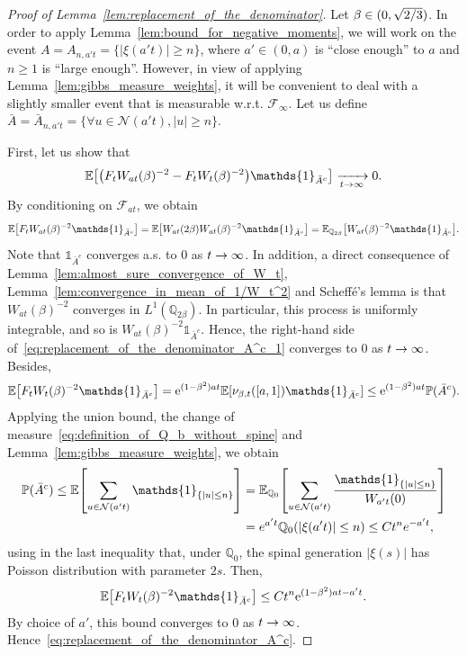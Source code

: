 \documentclass[AHL,Unicode,longabstracts,published]{cedram}
\newcommand{\e}{\mathrm{e}}
\newcommand{\E}{\mathbb{E}}
\renewcommand{\P}{\mathbb{P}}
\newcommand{\Q}{\mathbb{Q}}
\newcommand\1{\mathds{1}}
\newcommand{\cF}{\mathcal{F}}
\newcommand{\cN}{\mathcal{N}}
\newcommand{\Expec}[1]{\mathbb{E}\left[#1\right]}
\let\oldforall\forall
\renewcommand*{\forall}{\mathrel{\oldforall}}
\let\originalleft\left
\let\originalright\right
\renewcommand{\left}{\mathopen{}\mathclose\bgroup\originalleft}
\renewcommand{\right}{\aftergroup\egroup\originalright}
\renewcommand*{\to}{\mathchoice{\longrightarrow}{\rightarrow}{\rightarrow}{\rightarrow}}
\begin{document}
\begin{proof}[Proof of Lemma~\ref{lem:replacement_of_the_denominator}]
Let $\beta \in (0, \sqrt{2\smash{/}3})$. In order to apply Lemma~\ref{lem:bound_for_negative_moments}, we will work on the event $A = A_{n, a't} = \{|\xi(a't)| \geq n\}$, where $a' \in (0, a)$ is ``close enough'' to $a$ and $n \geq 1$ is ``large enough''. However, in view of applying Lemma~\ref{lem:gibbs_measure_weights}, it will be convenient to deal with a slightly smaller event that is measurable w.r.t. $\cF_\infty$. Let us define $\bar{A} = \bar{A}_{n, a't} = \{\forall u \in \cN(a't), |u| \geq n\}$.

First, let us show that
\begin{equation}\label{eq:replacement_of_the_denominator_A^c}
\E \left[\left(F_t W_{at}(\beta)^{-2} - F_t W_t(\beta)^{-2}\right) \1_{\bar{A}^c} \right] \xrightarrow[t \to \infty]{} 0.
\end{equation}
By conditioning on $\cF_{at}$, we obtain
\begin{equation}\label{eq:replacement_of_the_denominator_A^c_1}
\E\left[F_t W_{at}(\beta)^{-2} \1_{\bar{A}^c}\right] = \E\left[W_{at}(2\beta) W_{at}(\beta)^{-2} \1_{\bar{A}^c}\right] = \E_{\Q_{2\beta}}\left[W_{at}(\beta)^{-2} \1_{\bar{A}^c}\right].
\end{equation}
Note that $\1_{\bar{A}^c}$ converges a.s. to $0$ as $t \to\infty$. In addition, a direct consequence of Lemma~\ref{lem:almost_sure_convergence_of_W_t}, Lemma~\ref{lem:convergence_in_mean_of_1/W_t^2} and Scheffé's lemma is that $W_{at}(\beta)^{-2}$ converges in $L^1(\Q_{2\beta})$. In particular, this process is uniformly integrable, and so is $W_{at}(\beta)^{-2} \1_{\bar{A}^c}$. Hence, the right-hand side of~\eqref{eq:replacement_of_the_denominator_A^c_1} converges to $0$ as $t \to \infty$. Besides,
\begin{equation*}
\E\left[F_t W_t(\beta)^{-2} \1_{\bar{A}^c}\right] = \e^{(1 - \beta^2)at} \E \left[\nu_{\beta, t}([a, 1]) \1_{\bar{A}^c} \right] \leq \e^{(1 - \beta^2)at} \P(\bar{A}^c).
\end{equation*}
Applying the union bound, the change of measure~\eqref{eq:definition_of_Q_b_without_spine} and Lemma~\ref{lem:gibbs_measure_weights}, we obtain
\begin{equation}\label{eq:probability_of_Ac}
\begin{aligned}[t]
\P(\bar{A}^c)  \leq \Expec{\sum_{u\in\cN(a't)} \1_{\{|u| \leq n\}}} &= \E_{\Q_0} \left[\sum_{u \in \cN(a't)} \frac{ \1_{\{|u| \leq n\}}}{W_{a't}(0)} \right] \\
 &= e^{a't} \Q_0\left(|\xi(a't)| \leq n\right)
 \leq C t^n e^{-a' t},
\end{aligned}
\end{equation}
using in the last inequality that, under $\Q_0$, the spinal generation $|\xi(s)|$ has Poisson distribution with parameter $2s$. Then,
\begin{equation}\label{eq:replacement_of_the_denominator_A^c_bound}
\E\left[F_t W_t(\beta)^{-2} \1_{\bar{A}^c}\right] \leq C t^n \e^{(1 - \beta^2)at - a't}.
\end{equation}
By choice of $a'$, this bound converges to $0$ as $t \to \infty$. Hence~\eqref{eq:replacement_of_the_denominator_A^c}.


\end{proof}
\end{document}
